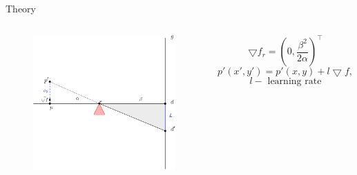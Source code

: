 \documentclass{beamer}
\begin{document}
\begin{frame}{Theory}
		\begin{columns}[T, onlytextwidth] %
			\begin{figure}
				\includegraphics[width = \textwidth]{Images/gradient2.png}
			\end{figure}

			\centering
			$$\bigtriangledown f_r = (0, \frac{\beta^2}{2\alpha})^\intercal$$
			$$p'(x', y') = p'(x, y) + l\bigtriangledown f,$$
			$$l - \text{ learning rate}$$
	\end{columns}
\end{frame}
\end{document}
